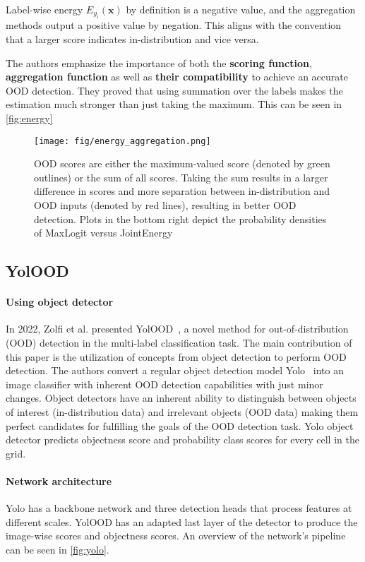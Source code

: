Label-wise energy $E_{y_i}(\mathbf{x})$ by definition is a negative value, and the aggregation methods output a positive value by negation. 
This aligns with the convention that a larger score indicates in-distribution and vice versa.

The authors emphasize the importance of both the \textbf{scoring function}, \textbf{aggregation function} as well as \textbf{their compatibility} to achieve an accurate OOD detection. 
They proved that using summation over the labels makes the estimation much stronger than just taking the maximum. This can be seen in \autoref{fig:energy}

\begin{figure}[h!]
\centering
\texttt{[image: fig/energy\_aggregation.png]}
\caption{OOD scores are either the maximum-valued score (denoted by green outlines) or the sum of all scores. 
Taking the sum results in a larger difference in scores and more separation between in-distribution and OOD inputs (denoted by red lines),
resulting in better OOD detection. 
Plots in the bottom right depict the probability densities of MaxLogit\cite{hendrycksScalingOutofDistributionDetection2022} versus JointEnergy\cite{Wang2021}}
\label{fig:energy}
\end{figure}


\subsection{YolOOD}
\paragraph{Using object detector}
In 2022, Zolfi et al. presented YolOOD~\cite{Zolfi2022}, a novel method for out-of-distribution (OOD) detection in the multi-label classification task. 
The main contribution of this paper is the utilization of concepts from object detection to perform OOD detection. 
The authors convert a regular object detection model Yolo~\cite{bochkovskiyYOLOv4OptimalSpeed2020} into an image classifier with inherent OOD detection capabilities with just minor changes.
Object detectors have an inherent ability to distinguish between objects of interest (in-distribution data) and irrelevant objects (OOD data) making them perfect candidates
for fulfilling the goals of the OOD detection task. Yolo object detector predicts objectness score and probability class scores for every cell in the grid.

\paragraph{Network architecture}
Yolo has a backbone network and three detection heads that process features at different scales.
YolOOD has an adapted last layer of the detector to produce the image-wise scores and objectness scores. An overview of the network's pipeline can be seen in \autoref{fig:yolo}.

